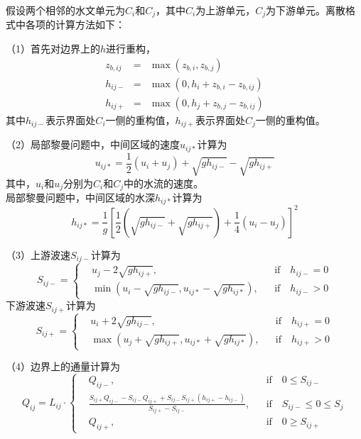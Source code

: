 假设两个相邻的水文单元为$C_i$和$C_j$，其中$C_i$为上游单元，$C_j$为下游单元。离散格式中各项的计算方法如下：

（1）首先对边界上的$h$进行重构，
\begin{eqnarray}
z_{b,ij} & = & \max\left(z_{b,i}, z_{b,j}\right) \\
h_{ij-} & = & \max\left(0, h_i + z_{b,i} - z_{b,ij} \right) \\
h_{ij+} & = & \max\left(0, h_j + z_{b,j} - z_{b,ij} \right)
\end{eqnarray}
其中$h_{ij-}$表示界面处$C_i$一侧的重构值，$h_{ij+}$表示界面处$C_j$一侧的重构值。

（2）局部黎曼问题中，中间区域的速度$u_{ij*}$计算为
	\begin{equation}
		u_{ij*} = \frac{1}{2}\left(u_i + u_j\right) + \sqrt{g h_{ij-}} - \sqrt{g h_{ij+}}
	\end{equation}
其中，$u_i$和$u_j$分别为$C_i$和$C_j$中的水流的速度。 \\
局部黎曼问题中，中间区域的水深$h_{ij*}$计算为
	\begin{equation}
		h_{ij*} = \frac{1}{g}\left[\frac{1}{2}\left(\sqrt{g h_{ij-}} + \sqrt{g h_{ij+}}\right) + \frac{1}{4}\left(u_i - u_j\right)\right]^2
	\end{equation}

（3）上游波速$S_{ij-}$计算为
	\begin{equation}
		S_{ij-} = \left\{
		\begin{aligned}
			&u_j - 2\sqrt{gh_{ij+}}, && \mbox{if} \quad h_{ij-} = 0 \\
			& \min \left(u_i - \sqrt{gh_{ij-}}, u_{ij*} - \sqrt{gh_{ij*}}\right), && \mbox{if} \quad h_{ij-} > 0
		\end{aligned}\right.
	\end{equation}
下游波速$S_{ij+}$计算为
	\begin{equation}
		S_{ij+} = \left\{
		\begin{aligned}
			&u_i + 2\sqrt{gh_{ij-}}, && \mbox{if} \quad h_{ij+} = 0 \\
			& \max \left(u_j + \sqrt{gh_{ij+}}, u_{ij*} + \sqrt{gh_{ij*}}\right), && \mbox{if} \quad h_{ij+} > 0
		\end{aligned}\right.
	\end{equation}

（4）边界上的通量计算为
\begin{equation}
	Q_{ij} = L_{ij} \cdot \left\{
	\begin{aligned}
		& Q_{ij-}, && \mbox{if} \quad 0\leq S_{ij-} \\
		& \frac{S_{ij+} Q_{ij-} - S_{ij-} Q_{ij+} + S_{ij-} S_{ij+} \left(h_{ij+} - h_{ij-}\right)}{S_{ij+}-S_{ij-}} , && \mbox{if} \quad S_{ij-} \leq 0\leq S_j\\
		& Q_{ij+}, && \mbox{if} \quad 0\geq S_{ij+}
	\end{aligned}\right.
\end{equation}

